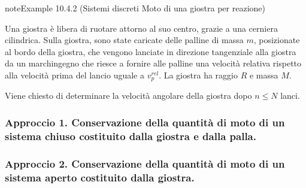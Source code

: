 \documentclass[letterpaper,10pt,italian]{jupyterBook}
\begin{document}
\begin{sphinxadmonition}{note}{Example 10.4.2 (Sistemi discreti \sphinxhyphen{} Moto di una giostra per reazione)}



\sphinxAtStartPar
Una giostra è libera di ruotare attorno al suo centro, grazie a una cerniera cilindrica. Sulla giostra, sono state caricate delle palline di massa \(m\), posizionate al bordo della giostra, che vengono lanciate in direzione tangenziale alla giostra da un marchingegno che riesce a fornire alle palline una velocità relativa rispetto alla velocità prima del lancio uguale a \(v_p^{rel}\). La giostra ha raggio \(R\) e massa \(M\).



\sphinxAtStartPar
Viene chiesto di determinare la velocità angolare della giostra dopo \(n \le N\) lanci.  

\sphinxAtStartPar
{}  
\subsubsection*{Approccio 1. Conservazione della quantità di moto di un sistema chiuso costituito dalla giostra e dalla palla.}
\subsubsection*{Approccio 2. Conservazione della quantità di moto di un sistema aperto costituito dalla giostra.}


\end{sphinxadmonition}
\end{document}
